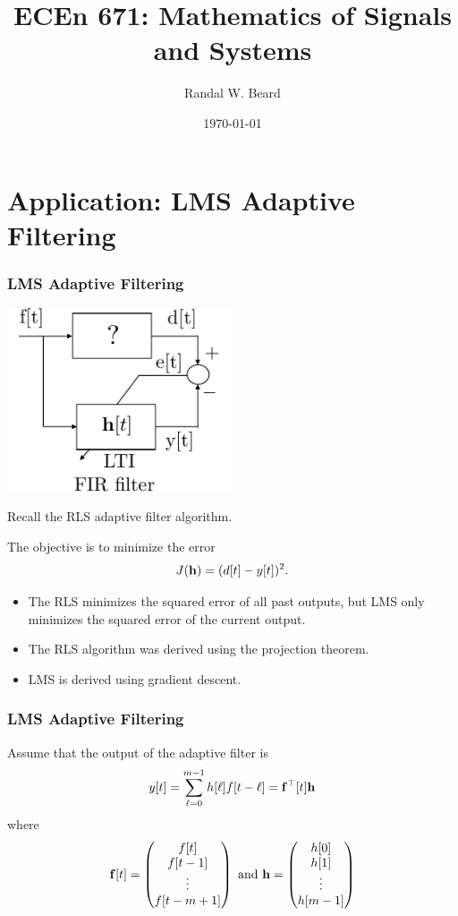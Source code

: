 \documentclass{beamer}
\title{ECEn 671: Mathematics of Signals and Systems}
\author{Randal W. Beard}
\institute{Brigham Young University}
\date{\today}
\begin{document}
\begin{frame}
	\titlepage
\end{frame}

\section{Application:  LMS Adaptive Filtering}
\frame{\sectionpage}

\begin{frame}\frametitle{LMS Adaptive Filtering}
		
	\begin{center}
		\includegraphics[width=0.5\textwidth]
			{figures/chap14_adaptive_filter}
	\end{center}
	Recall the RLS adaptive filter algorithm.
	
	The objective is to minimize the error
	\[ 
		J(\mathbf{h}) = (d[t] - y[t])^2.
	\]
	
	\begin{itemize}
		\item The RLS minimizes the squared error of all past outputs, but LMS only minimizes the squared error of the current output.
		\item The RLS algorithm was derived using the projection theorem.
		\item LMS is derived using gradient descent.
	\end{itemize}
\end{frame}

\begin{frame}\frametitle{LMS Adaptive Filtering}
	Assume that the output of the adaptive filter is
	\[ 
		y[t] = \sum_{\ell = 0}^{m-1}h[\ell]f[t-\ell] = \mathbf{f}^\top[t]\mathbf{h}
	\]
	where
	\[
		\mathbf{f}[t] 
			= \begin{pmatrix}
	    		f[t]\\
	    		f[t-1]\\
	    		\vdots\\
	    		f[t-m+1]
	  		  \end{pmatrix}
	  	\text{ and }
		\mathbf{h}
			= \begin{pmatrix}
	    		h[0]\\
	    		h[1]\\
	    		\vdots\\
	    		h[m-1]
	  		  \end{pmatrix}
	\]
\end{frame}
\end{document}
